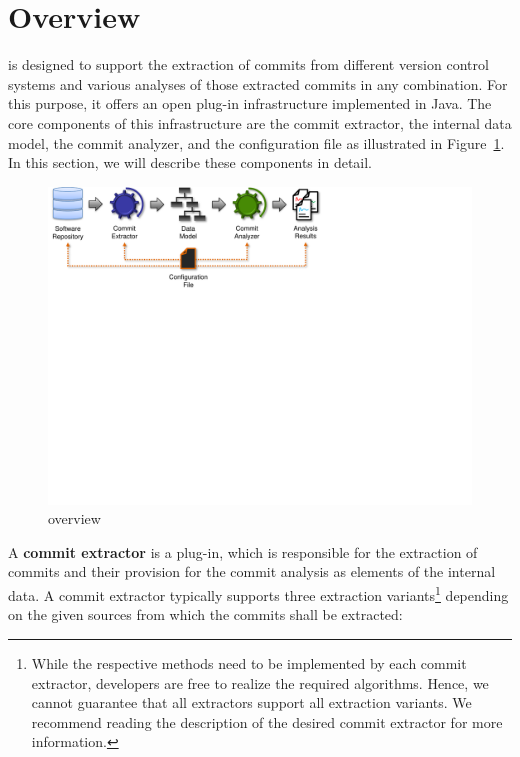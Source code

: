 \section{Overview}
\label{sec:Overview}
\thetool{} is designed to support the extraction of commits from different version control systems and various analyses of those extracted commits in any combination. For this purpose, it offers an open plug-in infrastructure implemented in Java. The core components of this infrastructure are the commit extractor, the internal data model, the commit analyzer, and the configuration file as illustrated in Figure~\ref{fig:Overview}. In this section, we will describe these components in detail.

\begin{figure}[h] %
	\centering
		\includegraphics[width=\columnwidth,trim={0,2cm 13cm 9cm 0cm},clip]{inserts/comani_overview.pdf}
  \caption{\thetool{} overview}
	\label{fig:Overview}
\end{figure}

A \textbf{commit extractor} is a \thetool{} plug-in, which is responsible for the extraction of commits and their provision for the commit analysis as elements of the internal data. A commit extractor typically supports three extraction variants\footnote{While the respective methods need to be implemented by each commit extractor, developers are free to realize the required algorithms. Hence, we cannot guarantee that all extractors support all extraction variants. We recommend reading the description of the desired commit extractor for more information.} depending on the given sources from which the commits shall be extracted:


